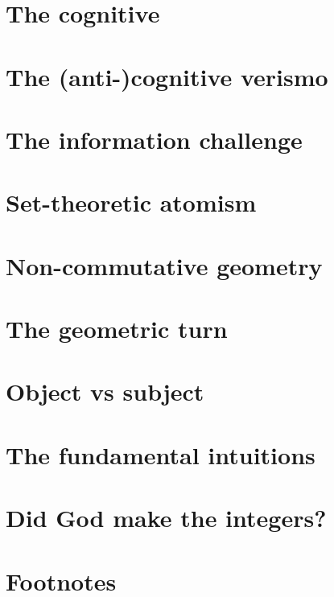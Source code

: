 \documentclass{article}
\begin{document}
\section{The cognitive}


\section{The (anti-)cognitive verismo}
\section{The information challenge}
\section{Set-theoretic atomism}
\section{Non-commutative geometry}
\section{The geometric turn}
\section{Object vs subject}
\section{The fundamental intuitions}
\section{Did God make the integers?}
\section*{Footnotes}
\end{document}
